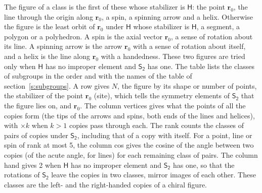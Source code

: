 \documentclass[10pt,a4paper]{article}
\numberwithin{equation}{section}
\newcommand{\grp}[1]{\mathsf{#1}}
\newcommand{\pointr}{\mathbf{r}}
\begin{document}
\leavevmode\label{n:head.figure}The figure of a class is the first of these whose stabilizer is $\grp{H}$: the point $\pointr_0$, the line through the origin along $\pointr_0$, a spin, a spinning arrow and a helix. Otherwise the figure is the least orbit of $\pointr_0$ under $\grp{H}$ whose stabilizer is $\grp{H}$, a segment, a polygon or a polyhedron. A spin is the axial vector $\pointr_0$, a sense of rotation about its line. A spinning arrow is the arrow $\pointr_0$ with a sense of rotation about itself, and a helix is the line along $\pointr_0$ with a handedness. These two figures are tried only when $\grp{H}$ has no improper element and $\grp{S_{2}}$ has one. The table lists the classes of subgroups in the order and with the names of the table of section~\ref{s:subgroups}. \label{n:head.site}A row gives $N$, the figure by its shape or number of points, the stabilizer of the point $\pointr_0$ (site), which tells the symmetry elements of $\grp{S_{2}}$ that the figure lies on, and $\pointr_0$. \label{n:head.vertices}The column vertices gives what the points of all the copies form (the tips of the arrows and spins, both ends of the lines and helices), with ${\times}k$ when $k > 1$ copies pass through each. \label{n:head.rank}The rank counts the classes of pairs of copies under $\grp{S_{2}}$, including that of a copy with itself. \label{n:head.cos}For a point, line or spin of rank at most 5, the column cos gives the cosine of the angle between two copies (of the acute angle, for lines) for each remaining class of pairs. \label{n:head.hand}The column hand gives 2 when $\grp{H}$ has no improper element and $\grp{S_{2}}$ has one, so that the rotations of $\grp{S_{2}}$ leave the copies in two classes, mirror images of each other. These classes are the left- and the right-handed copies of a chiral figure.
\end{document}
